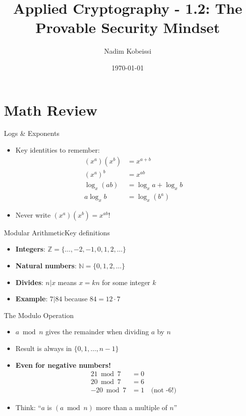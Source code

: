 \documentclass[aspectratio=169, lualatex, handout]{beamer}
\title{Applied Cryptography - 1.2: The Provable Security Mindset}
\author{Nadim Kobeissi}
\institute{American University of Beirut}
\date{\today}
\begin{document}
\begin{frame}[plain]
	\titlepage
\end{frame}

\section{Math Review}

\begin{frame}{Logs \& Exponents}
	\begin{itemize}[<+->]
		\item Key identities to remember:
		      \begin{align*}
			      (x^a)(x^b) & = x^{a+b}             \\
			      (x^a)^b    & = x^{ab}              \\
			      \log_x(ab) & = \log_x a + \log_x b \\
			      a \log_x b & = \log_x(b^a)
		      \end{align*}
		\item \alert{Never write $(x^a)(x^b) = x^{ab}$!}
	\end{itemize}
\end{frame}

\begin{frame}{Modular Arithmetic}{Key definitions}
	\begin{itemize}[<+->]
		\item \textbf{Integers}: $\mathbb{Z} = \{\ldots, -2, -1, 0, 1, 2, \ldots\}$
		\item \textbf{Natural numbers}: $\mathbb{N} = \{0, 1, 2, \ldots\}$
		\item \textbf{Divides}: $n | x$ means $x = kn$ for some integer $k$
		\item \textbf{Example}: $7 | 84$ because $84 = 12 \cdot 7$
	\end{itemize}
\end{frame}

\begin{frame}{The Modulo Operation}
	\begin{itemize}[<+->]
		\item $a \bmod n$ gives the remainder when dividing $a$ by $n$
		\item Result is always in $\{0, 1, \ldots, n-1\}$
		\item \textbf{Even for negative numbers!}
		      \begin{align*}
			      21 \bmod 7  & = 0                        \\
			      20 \bmod 7  & = 6                        \\
			      -20 \bmod 7 & = 1 \quad \text{(not -6!)}
		      \end{align*}
		\item Think: ``$a$ is $(a \bmod n)$ more than a multiple of $n$''
	\end{itemize}
\end{frame}
\end{document}
